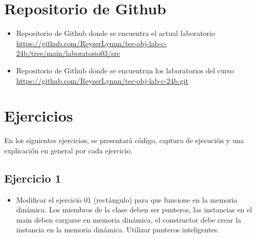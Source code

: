 \documentclass{article}
\begin{document}
\section{Repositorio de Github}
	\begin{itemize}
		\item Repositorio de Github donde se encuentra el actual laboratorio \\
		\url{https://github.com/ReyserLynnn/tec-obj-lab-c-24b/tree/main/laboratorio03/src}

        \item Repositorio de Github donde se encuentran los laboratorios del curso\\
		\url{https://github.com/ReyserLynnn/tec-obj-lab-c-24b.git}
	\end{itemize}
 

\section{Ejercicios}
En los siguientes ejercicios, se presentará código, captura de ejecución y una explicación en general por cada ejercicio.\\

    \subsection{Ejercicio 1}
        \begin{itemize}
            \item Modificar el ejercicio 01 (rectángulo) para que funcione en la memoria dinámica. Los miembros de la clase deben ser punteros, las instancias en el main deben cargarse en memoria dinámica, el constructor debe crear la instancia en la memoria dinámica. Utilizar punteros inteligentes.

        \end{itemize}  
        
        

        

        
        
\end{document}
